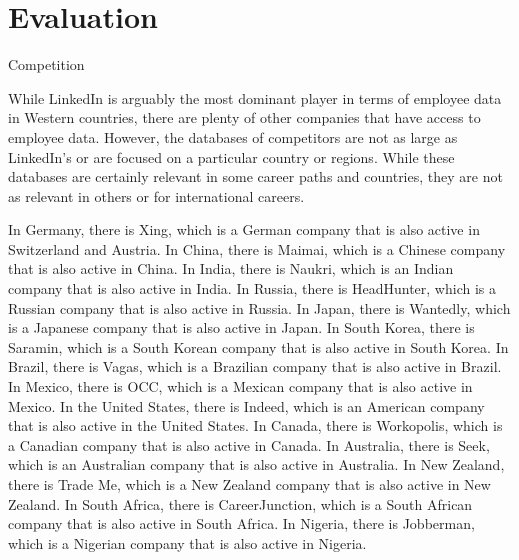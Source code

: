 \section{Evaluation}
\label{sec:evaluation}

Competition


While LinkedIn is arguably the most dominant player in terms of employee data in Western countries,
there are plenty of other companies that have access to employee data. However, the databases of competitors are
not as large as LinkedIn's or are focused on a particular country or regions. While these databases are certainly
relevant in some career paths and countries, they are not as relevant in others or for international careers.

In Germany, there is Xing, which is a German company that is also active in Switzerland and Austria.
In China, there is Maimai, which is
a Chinese company that is also active in China. In India, there is Naukri, which is an Indian company that is also
active in India. In Russia, there is HeadHunter, which is a Russian company that is also active in Russia. In Japan,
there is Wantedly, which is a Japanese company that is also active in Japan. In South Korea, there is Saramin, which
is a South Korean company that is also active in South Korea. In Brazil, there is Vagas, which is a Brazilian company
that is also active in Brazil. In Mexico, there is OCC, which is a Mexican company that is also active in Mexico.
In the United States, there is Indeed, which is an American company that is also active in the United States. In
Canada, there is Workopolis, which is a Canadian company that is also active in Canada. In Australia, there is
Seek, which is an Australian company that is also active in Australia. In New Zealand, there is Trade Me, which is
a New Zealand company that is also active in New Zealand. In South Africa, there is CareerJunction, which is a
South African company that is also active in South Africa. In Nigeria, there is Jobberman, which is a Nigerian
company that is also active in Nigeria.
